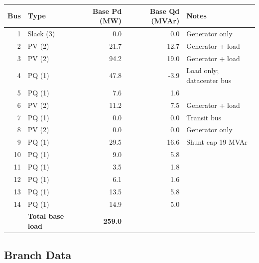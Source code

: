 \documentclass[11pt]{article}
\begin{document}
\begin{center}
\begin{tabular}{rlrrl}
\toprule
Bus & Type & Base Pd (MW) & Base Qd (MVAr) & Notes \\
\midrule
1  & Slack (3) & 0.0  & 0.0  & Generator only \\
2  & PV (2)    & 21.7 & 12.7 & Generator + load \\
3  & PV (2)    & 94.2 & 19.0 & Generator + load \\
4  & PQ (1)    & 47.8 & -3.9 & Load only; datacenter bus \\
5  & PQ (1)    & 7.6  & 1.6  & \\
6  & PV (2)    & 11.2 & 7.5  & Generator + load \\
7  & PQ (1)    & 0.0  & 0.0  & Transit bus \\
8  & PV (2)    & 0.0  & 0.0  & Generator only \\
9  & PQ (1)    & 29.5 & 16.6 & Shunt cap 19 MVAr \\
10 & PQ (1)    & 9.0  & 5.8  & \\
11 & PQ (1)    & 3.5  & 1.8  & \\
12 & PQ (1)    & 6.1  & 1.6  & \\
13 & PQ (1)    & 13.5 & 5.8  & \\
14 & PQ (1)    & 14.9 & 5.0  & \\
\midrule
   & \textbf{Total base load} & \textbf{259.0} & & \\
\bottomrule
\end{tabular}
\end{center}

\subsection{Branch Data}
\end{document}

